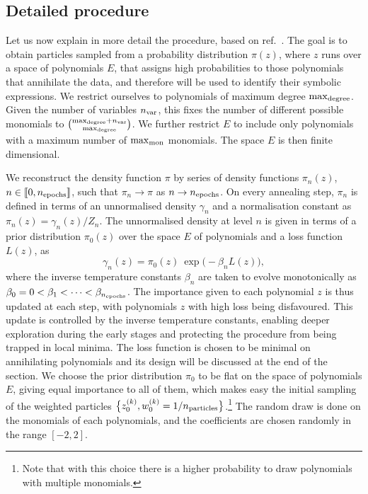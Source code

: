 \documentclass[11pt,a4paper]{article}
\begin{document}
	\subsection{Detailed procedure}	\label{sec:detailedAISSMC}
	Let us now explain in more detail the procedure, based on ref.~\cite{del2006sequential,DoucetTutorial,naesseth2024elementssequentialmontecarlo,Dai03072022}. 
	The goal is to obtain particles sampled from a probability distribution $\pi(z)$, where $z$ runs over a space of polynomials $E$, that assigns high probabilities to those polynomials that annihilate the data, and therefore will be used to identify their symbolic expressions. We restrict ourselves to polynomials of maximum degree ${\rm max}_{\rm degree}$. Given the number of variables $n_{\rm var}$, this fixes the number of different possible monomials to $\binom{{\rm max}_{\rm degree}+n_{\rm var}}{{\rm max}_{\rm degree}}$. We further restrict $E$ to include only polynomials with a maximum number of ${\rm max}_{\rm mon}$ monomials. The space $E$ is then finite dimensional.

	We reconstruct the density function $\pi$ by series of density functions $\pi_n(z)$, $n\in\llbracket0,n_{\rm epochs}\rrbracket$, such that $\pi_n\to \pi$ as $n\to n_{\rm epochs}$. On every annealing step, $\pi_n$ is defined in terms of an unnormalised density $\gamma_n$ and a normalisation constant as $\pi_n(z) = \gamma_n(z)/Z_n$. The unnormalised density at level $n$ is given in terms of a prior distribution $\pi_0(z)$ over the space $E$ of polynomials and a loss function $L(z)$, as
		\begin{equation}\label{eq:gamman}
			\gamma_n(z) = \pi_0(z) \: \exp \Big( -\beta_n L(z)\Big),
		\end{equation}
	where the inverse temperature constants $\beta_n$ are taken to evolve monotonically as $\beta_0 = 0 < \beta_1 <\dots< \beta_{n_{\rm epochs}}$. The importance given to each polynomial $z$ is thus updated at each step, with polynomials $z$ with high loss being disfavoured. This update is controlled by the inverse temperature constants, enabling deeper exploration during the early stages and protecting the procedure from being trapped in local minima. The loss function is chosen to be minimal on annihilating polynomials and its design will be discussed at the end of the section. We choose the prior distribution $\pi_{0}$ to be flat on the space of polynomials $E$, giving equal importance to all of them, which makes easy the initial sampling of the weighted particles $\big\{z^{(k)}_{0},w^{(k)}_{0} = 1/n_{\rm particles}\big\}$.\footnote{Note that with this choice there is a higher probability to draw polynomials with multiple monomials.} The random draw is done on the monomials of each polynomials, and the coefficients are chosen randomly in the range $[-2,2]$.
\end{document}
